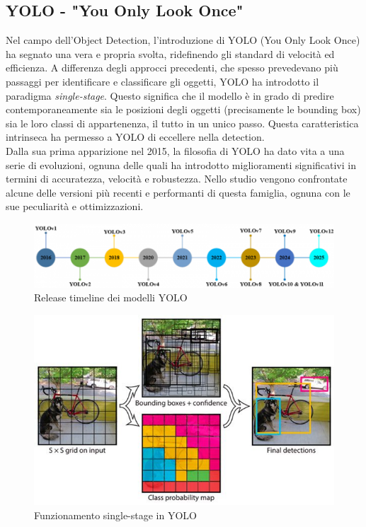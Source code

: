 \documentclass[12pt]{article}
\begin{document}
\subsection{YOLO - "You Only Look Once"}
Nel campo dell'Object Detection, l'introduzione di YOLO\cite{YOLO} (You Only Look Once) ha segnato una vera e propria svolta, ridefinendo gli standard di velocità ed efficienza. A differenza degli approcci precedenti, che spesso prevedevano più passaggi per identificare e classificare gli oggetti, YOLO ha introdotto il paradigma \textit{single-stage}. Questo significa che il modello è in grado di predire contemporaneamente sia le posizioni degli oggetti (precisamente le bounding box) sia le loro classi di appartenenza, il tutto in un unico passo. Questa caratteristica intrinseca ha permesso a YOLO di eccellere nella detection. \\
Dalla sua prima apparizione nel 2015, la filosofia di YOLO ha dato vita a una serie di evoluzioni, ognuna delle quali ha introdotto miglioramenti significativi in termini di accuratezza, velocità e robustezza. Nello studio vengono confrontate alcune delle versioni più recenti e performanti di questa famiglia, ognuna con le sue peculiarità e ottimizzazioni.

\begin{figure}[H]
    \centering
    \includegraphics[width=1.0\textwidth]{./img/yolo-timeline.png}
    \caption{Release timeline dei modelli YOLO}
    \label{fig:yolo-timeline}
\end{figure}


\begin{figure}[H]
    \centering
    \includegraphics[width=1.1\textwidth]{./img/yolo-single-stage.jpg}
    \caption{Funzionamento single-stage in YOLO}
    \label{fig:yolo-single-stage}
\end{figure}
\end{document}
